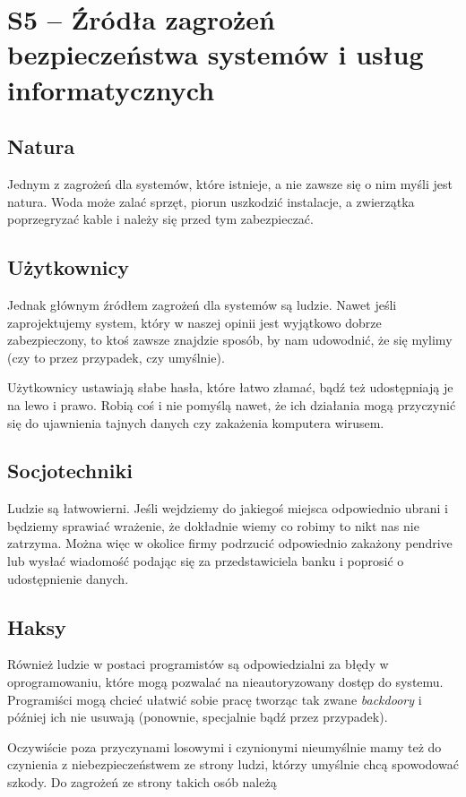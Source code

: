 \section{S5 -- Źródła zagrożeń bezpieczeństwa systemów i usług informatycznych}

\subsection{Natura}
Jednym z zagrożeń dla systemów, które istnieje, a nie zawsze się o nim myśli jest natura.
Woda może zalać sprzęt, piorun uszkodzić instalacje, a zwierzątka poprzegryzać kable i należy się przed tym zabezpieczać.

\subsection{Użytkownicy}
Jednak głównym źródłem zagrożeń dla systemów są ludzie.
Nawet jeśli zaprojektujemy system, który w naszej opinii jest wyjątkowo dobrze zabezpieczony, to ktoś zawsze znajdzie sposób, by nam udowodnić, że się mylimy (czy to przez przypadek, czy umyślnie).

Użytkownicy ustawiają słabe hasła, które łatwo złamać, bądź też udostępniają je na lewo i prawo.
Robią coś i nie pomyślą nawet, że ich działania mogą przyczynić się do ujawnienia tajnych danych czy zakażenia komputera wirusem.

\subsection{Socjotechniki}
Ludzie są łatwowierni.
Jeśli wejdziemy do jakiegoś miejsca odpowiednio ubrani i będziemy sprawiać wrażenie, że dokładnie wiemy co robimy to nikt nas nie zatrzyma.
Można więc w okolice firmy podrzucić odpowiednio zakażony pendrive lub wysłać wiadomość podając się za przedstawiciela banku i poprosić o udostępnienie danych.

\subsection{Haksy}
Również ludzie w postaci programistów są odpowiedzialni za błędy w oprogramowaniu, które mogą pozwalać na nieautoryzowany dostęp do systemu.
Programiści mogą chcieć ułatwić sobie pracę tworząc tak zwane \textit{backdoory} i później ich nie usuwają (ponownie, specjalnie bądź przez przypadek).

Oczywiście poza przyczynami losowymi i czynionymi nieumyślnie mamy też do czynienia z niebezpieczeństwem ze strony ludzi, którzy umyślnie chcą spowodować szkody.
Do zagrożeń ze strony takich osób należą

